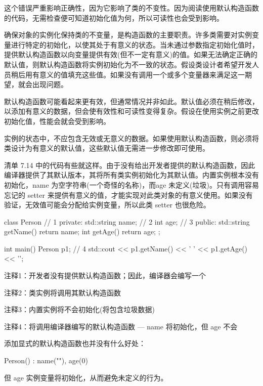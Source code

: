 这个错误严重影响正确性，因为它影响了类的不变性。因为阅读使用默认构造函数的代码，无需检查便可知道初始化值为何，所以可读性也会受到影响。

确保对象的实例化保持类的不变量，是构造函数的主要职责。许多类需要对实例变量进行特定的初始化，以使其处于有意义的状态。当未通过参数指定初始化值时，提供默认构造函数以向变量提供有效(但不一定有意义)的值。如果无法确定正确的默认值，则默认构造函数将实例初始化为不一致的状态。假设类设计者希望开发人员稍后用有意义的值填充这些值。如果没有调用一个或多个变量器来满足这一期望，就会出现问题。


默认构造函数可能看起来更有效，但通常情况并非如此。默认值必须在稍后修改，以添加有意义的数据，但会使有效性和可读性变得复杂。假设在使用实例之前更改初始化值，性能会就会受到影响。

实例的状态中，不应包含无效或无意义的数据。如果使用默认构造函数，则必须将类设计为有意义的默认值，这些默认值无需进一步修改即可使用。

清单 7.14 中的代码有些就这样。由于没有给出开发者提供的默认构造函数，因此编译器提供了其默认版本，其将所有类实例初始化为其默认值。内置实例根本没有初始化，name 为空字符串(一个奇怪的名称)，而age 未定义(垃圾)。只有调用容易忘记的 setter 来提供有意义的值，才能实现对此类对象的有意义使用。如果没有验证，无效值可能会分配给实例变量，所以此类 setter 也很危险。


\begin{cpp}
class Person { // 1
private:
  std::string name; // 2
  int age; // 3
public:
  std::string getName() { return name; }
  int getAge() { return age; }
};

int main() {
  Person p1; // 4
  std::cout << p1.getName() << ' ' << p1.getAge() << '\n';
}
\end{cpp}

{\footnotesize
注释1：开发者没有提供默认构造函数；因此，编译器会编写一个

注释2：类实例将调用其默认构造函数

注释3：内置实例将不会初始化(将包含垃圾数据)

注释4：将调用编译器编写的默认构造函数 — name 将初始化，但 age 不会
}

添加显式的默认构造函数也并没有什么好处：

\begin{cpp}
Person() : name(""), age(0) {}
\end{cpp}

但 age 实例变量将初始化，从而避免未定义的行为。


